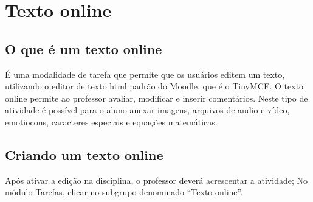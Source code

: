 \section{Texto online}

\subsection{O que é um texto online}
É uma modalidade de tarefa que permite que os usuários editem um texto, utilizando o editor de texto html padrão do Moodle, que é o TinyMCE. O texto online permite ao professor avaliar, modificar e inserir comentários.  Neste tipo de atividade é possível para o aluno anexar imagens, arquivos de audio e vídeo, emotiocons, caracteres especiais e equações matemáticas.
\subsection{Criando um texto online}

Após ativar a edição na disciplina, o professor deverá acrescentar a atividade; No módulo Tarefas, clicar no subgrupo denominado “Texto online”.

\begin{figure}[!htbp]
 \begin{center}
  \label{fig:cap5_32}
 \end{center}
\end{figure}

